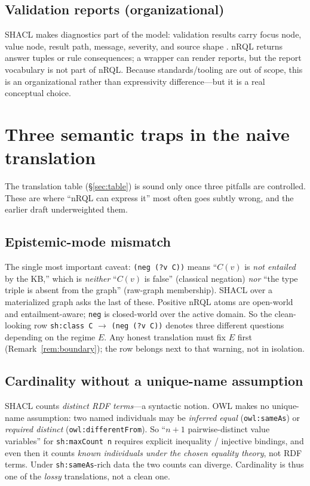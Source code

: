 \documentclass[11pt,letterpaper]{article}
\theoremstyle{definition}
\newcommand{\nrql}{nRQL}
\newcommand{\shacl}{SHACL}
\newcommand{\rdf}{RDF}
\newcommand{\owl}{OWL}
\begin{document}
\subsection{Validation reports (organizational)}
\shacl{} makes diagnostics part of the model: validation results carry focus node, value node, result path, message, severity, and source shape \cite{shacl}. \nrql{} returns answer tuples or rule consequences; a wrapper can render reports, but the report vocabulary is not part of \nrql{}. Because standards/tooling are out of scope, this is an organizational rather than expressivity difference---but it is a real conceptual choice.

\section{Three semantic traps in the naive translation}\label{sec:traps}

The translation table (\S\ref{sec:table}) is sound only once three pitfalls are controlled. These are where ``\nrql{} can express it'' most often goes subtly wrong, and the earlier draft underweighted them.

\subsection{Epistemic-mode mismatch}
The single most important caveat: \texttt{(neg (?v C))} means ``$C(v)$ is \emph{not entailed} by the KB,'' which is \emph{neither} ``$C(v)$ is false'' (classical negation) \emph{nor} ``the type triple is absent from the graph'' (raw-graph membership). \shacl{} over a materialized graph asks the last of these. Positive \nrql{} atoms are open-world and entailment-aware; \texttt{neg} is closed-world over the active domain. So the clean-looking row \texttt{sh:class C} $\to$ \texttt{(neg (?v C))} denotes three different questions depending on the regime $E$. Any honest translation must fix $E$ first (Remark~\ref{rem:boundary}); the row belongs next to that warning, not in isolation.

\subsection{Cardinality without a unique-name assumption}
\shacl{} counts \emph{distinct \rdf{} terms}---a syntactic notion. \owl{} makes no unique-name assumption: two named individuals may be \emph{inferred equal} (\texttt{owl:sameAs}) or \emph{required distinct} (\texttt{owl:differentFrom}). So ``$n{+}1$ pairwise-distinct value variables'' for \texttt{sh:maxCount n} requires explicit inequality / injective bindings, and even then it counts \emph{known individuals under the chosen equality theory}, not \rdf{} terms. Under \texttt{sh:sameAs}-rich data the two counts can diverge. Cardinality is thus one of the \emph{lossy} translations, not a clean one.
\end{document}
